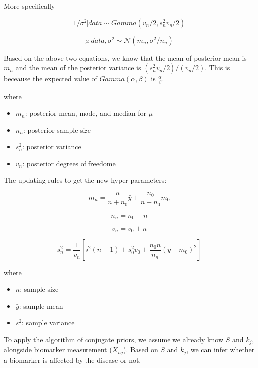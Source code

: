 \documentclass[
  letterpaper,
  DIV=11,
  numbers=noendperiod]{scrreprt}
\providecommand{\tightlist}{%
  \setlength{\itemsep}{0pt}\setlength{\parskip}{0pt}}\usepackage{longtable,booktabs,array}
\begin{document}
More specifically

\[1/\sigma^2 | data \sim Gamma(v_n/2, s_n^2 v_n/2)\]

\[\mu | data, \sigma^2 \sim \mathcal{N}(m_n, \sigma^2/n_n)\]

Based on the above two equations, we know that the mean of posterior
mean is \(m_n\) and the mean of the posterior variance is
\((s_n^2 v_n/2)/(v_n/2)\). This is beceause the expected value of
\(Gamma(\alpha, \beta)\) is \(\frac{\alpha}{\beta}\).

where

\begin{itemize}
\tightlist
\item
  \(m_n\): posterior mean, mode, and median for \(\mu\)
\item
  \(n_n\): posterior sample size
\item
  \(s_n^2\): posterior variance
\item
  \(v_n\): posterior degrees of freedome
\end{itemize}

The updating rules to get the new hyper-parameters:

\[m_n = \frac{n}{n+n_0} \bar{y} + \frac{n_0}{n+n_0}m_0\]

\[n_n = n_0 + n\]

\[v_n = v_0 + n\]

\[s_n^2 = \frac{1}{v_n}\left[s^2(n-1) + s_0^2v_0 + \frac{n_0n}{n_n}(\bar{y}-m_0)^2\right]\]

where

\begin{itemize}
\tightlist
\item
  \(n\): sample size
\item
  \(\bar{y}\): sample mean
\item
  \(s^2\): sample variance
\end{itemize}

\begin{tcolorbox}[enhanced jigsaw, bottomrule=.15mm, colback=white, bottomtitle=1mm, titlerule=0mm, arc=.35mm, breakable, rightrule=.15mm, opacityback=0, leftrule=.75mm, opacitybacktitle=0.6, colframe=quarto-callout-tip-color-frame, coltitle=black, toptitle=1mm, colbacktitle=quarto-callout-tip-color!10!white, title=\textcolor{quarto-callout-tip-color}{\faLightbulb}\hspace{0.5em}{Tip}, left=2mm, toprule=.15mm]

To apply the algorithm of conjugate priors, we assume we already know
\(S\) and \(k_j\), alongside biomarker measurement (\(X_{nj}\)). Based
on \(S\) and \(k_j\), we can infer whether a biomarker is affected by
the disease or not.

\end{tcolorbox}
\end{document}
